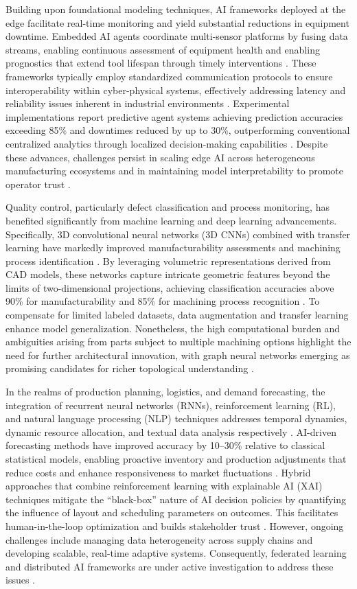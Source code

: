 \documentclass[sigconf]{acmart}
\begin{document}
Building upon foundational modeling techniques, AI frameworks deployed at the edge facilitate real-time monitoring and yield substantial reductions in equipment downtime. Embedded AI agents coordinate multi-sensor platforms by fusing data streams, enabling continuous assessment of equipment health and enabling prognostics that extend tool lifespan through timely interventions \cite{ref35}. These frameworks typically employ standardized communication protocols to ensure interoperability within cyber-physical systems, effectively addressing latency and reliability issues inherent in industrial environments \cite{ref36}. Experimental implementations report predictive agent systems achieving prediction accuracies exceeding 85\% and downtimes reduced by up to 30\%, outperforming conventional centralized analytics through localized decision-making capabilities \cite{ref35}. Despite these advances, challenges persist in scaling edge AI across heterogeneous manufacturing ecosystems and in maintaining model interpretability to promote operator trust \cite{ref38}.

Quality control, particularly defect classification and process monitoring, has benefited significantly from machine learning and deep learning advancements. Specifically, 3D convolutional neural networks (3D CNNs) combined with transfer learning have markedly improved manufacturability assessments and machining process identification \cite{ref39}. By leveraging volumetric representations derived from CAD models, these networks capture intricate geometric features beyond the limits of two-dimensional projections, achieving classification accuracies above 90\% for manufacturability and 85\% for machining process recognition \cite{ref39}. To compensate for limited labeled datasets, data augmentation and transfer learning enhance model generalization. Nonetheless, the high computational burden and ambiguities arising from parts subject to multiple machining options highlight the need for further architectural innovation, with graph neural networks emerging as promising candidates for richer topological understanding \cite{ref39}.

In the realms of production planning, logistics, and demand forecasting, the integration of recurrent neural networks (RNNs), reinforcement learning (RL), and natural language processing (NLP) techniques addresses temporal dynamics, dynamic resource allocation, and textual data analysis respectively \cite{ref40}. AI-driven forecasting methods have improved accuracy by 10–30\% relative to classical statistical models, enabling proactive inventory and production adjustments that reduce costs and enhance responsiveness to market fluctuations \cite{ref40,ref45}. Hybrid approaches that combine reinforcement learning with explainable AI (XAI) techniques mitigate the “black-box” nature of AI decision policies by quantifying the influence of layout and scheduling parameters on outcomes. This facilitates human-in-the-loop optimization and builds stakeholder trust \cite{ref45}. However, ongoing challenges include managing data heterogeneity across supply chains and developing scalable, real-time adaptive systems. Consequently, federated learning and distributed AI frameworks are under active investigation to address these issues \cite{ref40}.
\end{document}
